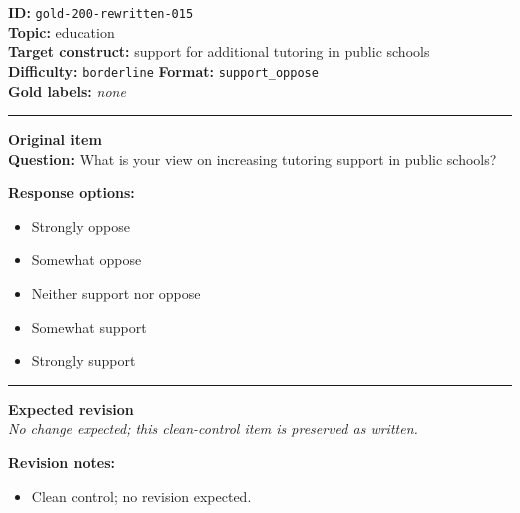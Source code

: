 \documentclass[10pt,a4paper]{article}
\newcommand{\sectionline}{\vspace{0.15em}\hrule\vspace{0.35em}}
\begin{document}
\begin{tcolorbox}[colframe=CleanGreen,colback=white,colbacktitle=CleanGreen!9,coltitle=black,title={Item 015\hfill Clean control}]
\textbf{ID:} \texttt{gold-200-rewritten-015}\\
\textbf{Topic:} education\\
\textbf{Target construct:} support for additional tutoring in public schools\\
\textbf{Difficulty:} \texttt{borderline} \quad \textbf{Format:} \texttt{support\_oppose}\\
\textbf{Gold labels:} \textit{none}\\
\sectionline
\textbf{Original item}\\
\textbf{Question:} What is your view on increasing tutoring support in public schools?
\par\textbf{Response options:}
\begin{itemize}
\item Strongly oppose
\item Somewhat oppose
\item Neither support nor oppose
\item Somewhat support
\item Strongly support
\end{itemize}
\sectionline
\textbf{Expected revision}\\
\textit{No change expected; this clean-control item is preserved as written.}
\par\textbf{Revision notes:}
\begin{itemize}
\item Clean control; no revision expected.
\end{itemize}
\end{tcolorbox}
\end{document}

